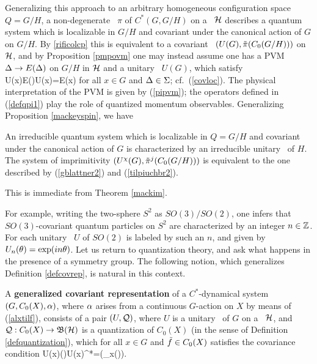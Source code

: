 Generalizing this approach to an arbitrary homogeneous configuration
space $Q=G/H$, a non-degenerate \rep\ $\pi$ of $C^*(G,G/H)$ 
on a \Hs\ ${\cal H}$ describes
a quantum system which is localizable in $G/H$ and covariant under the
canonical action of $G$ on $G/H$. By  \ref{rificolcp}
this is equivalent to a covariant \rep\  $(U(G),\tilde{\pi}(C_0(G/H)))$
on ${\cal H}$,
and by Proposition \ref{pmpovm} one may instead assume one has a 
PVM $\Delta\rightarrow E(\Delta)$ on $G/H$ in ${\cal H}$ and  a unitary \rep\ $U(G)$, 
which satisfy 
\be
U(x)E(\Dl)U(x)\inv=E(x\Dl) 
\ee
for all $x\in G$ and $\Delta\in\Sigma$; cf.\ (\ref{covloc}). 
The physical interpretation of the PVM is given by (\ref{pipvm});
the operators
defined in (\ref{defqpi1}) play the role of quantized momentum
observables. Generalizing Proposition \ref{mackeyspin}, we have
\begin{Theorem}
An irreducible quantum system which is localizable in $Q=G/H$
and covariant under the canonical action of $G$ 
is characterized by an irreducible unitary \rep\ 
of $H$.
The system of imprimitivity $(U^{\chi}(G),\tilde{\pi}^j(C_0(G/H)))$
is equivalent to the one described by (\ref{gblattner2})
and  (\ref{tilpiuchbr2}).
\end{Theorem}

This is immediate from Theorem \ref{mackim}.\enp

For example, writing the two-sphere $S^2$ as $SO(3)/SO(2)$, one infers that
$SO(3)$-covariant quantum particles on $S^2$ are characterized by an integer $n\in\Bbb Z$.
For each unitary \irrep\ $U$ of $SO(2)$ is labeled by such an $n$, and given by
$U_n(\theta)=\exp(in\theta)$.
Let us return to quantization theory, and ask
what happens  in the presence of a  symmetry group. The following notion, which generalizes
Definition \ref{defcovrep}, is natural in this context.
\begin{Definition}
A {\bf generalized covariant representation} of a $C^*$-dynamical system 
\\ $(G,C_0(X),\alpha)$,
where $\alpha$ arises from a continuous $G$-action on $X$ by means of
(\ref{alxtilf}), consists
of a pair $(U,{\cal Q})$, where $U$ is a
   unitary \rep\ of $G$ on a \Hs\ ${\cal H}$, and 
${\cal Q}:C_0(X)\rightarrow{\frak B}({\cal H})$ is a quantization of $C_0(X)$ (in the sense of Definition
\ref{defquantization}), which for all $x\in G$ and $\tilde{f}\in C_0(X)$
 satisfies  
 the covariance condition 
\be
U(x)\CQ()U(x)^*=\CQ(\al_x()). 
\ee  
\end{Definition}

